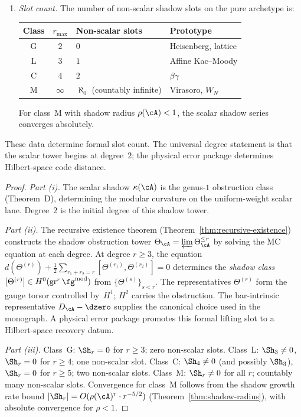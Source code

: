 \begin{theorem}
\begin{enumerate}[label=\textup{(\roman*)}]
\item \emph{Slot count.}
 The number of non-scalar shadow slots on the pure archetype is:
 \begin{center}
 \renewcommand{\arraystretch}{1.3}
 \begin{tabular}{ccll}
 \textbf{Class} & $r_{\max}$ & \textbf{Non-scalar slots}
 & \textbf{Prototype} \\
 \midrule
 G & $2$ & $0$ & Heisenberg, lattice \\
 L & $3$ & $1$ & Affine Kac--Moody \\
 C & $4$ & $2$ & $\beta\gamma$ \\
 M & $\infty$ & $\aleph_0$ \textup{(}countably infinite\textup{)}
 & Virasoro, $W_N$
 \end{tabular}
 \end{center}
 For class~M with shadow radius $\rho(\cA) < 1$, the scalar shadow
 series converges absolutely.
\end{enumerate}
These data determine formal slot count.  The universal degree statement
is that the scalar tower begins at degree~$2$; the physical error
package determines Hilbert-space code distance.
\end{theorem}

\begin{proof}
\emph{Part (i).} The scalar shadow $\kappa(\cA)$ is the
genus-$1$ obstruction class (Theorem~D), determining the
modular curvature on the uniform-weight scalar lane.  Degree~$2$ is
the initial degree of this shadow tower.

\emph{Part (ii).} The recursive existence theorem
(Theorem~\ref{thm:recursive-existence}) constructs the
shadow obstruction tower $\Theta_\cA = \varprojlim \Theta_\cA^{\le r}$
by solving the MC equation at each degree. At degree $r \ge 3$,
the equation
$d(\Theta^{(r)}) + \tfrac{1}{2}\sum_{r_1+r_2=r}
[\Theta^{(r_1)}, \Theta^{(r_2)}] = 0$
determines the \emph{shadow class}
$[\Theta^{(r)}] \in H^0(\operatorname{gr}^r \fg^{\mathrm{mod}})$
from $\{\Theta^{(s)}\}_{s < r}$.
The representatives $\Theta^{(r)}$ form the gauge torsor controlled
by~$H^1$; $H^2$ carries the obstruction.
The bar-intrinsic representative $D_\cA-\dzero$ supplies the canonical
choice used in the monograph.  A physical error package promotes this
formal lifting slot to a Hilbert-space recovery datum.

\emph{Part (iii).}
Class~G: $\Sh_r = 0$ for $r \ge 3$; zero non-scalar slots.
Class~L: $\Sh_3 \ne 0$, $\Sh_r = 0$ for $r \ge 4$; one non-scalar slot.
Class~C: $\Sh_4 \ne 0$ (and possibly $\Sh_3$), $\Sh_r = 0$
for $r \ge 5$; two non-scalar slots.
Class~M: $\Sh_r \ne 0$ for all $r$; countably many non-scalar slots.
Convergence for class~M follows from the shadow growth rate
bound $|\Sh_r| = O(\rho(\cA)^r \cdot r^{-5/2})$
(Theorem~\ref{thm:shadow-radius}), with absolute convergence
for $\rho < 1$.
\end{proof}

